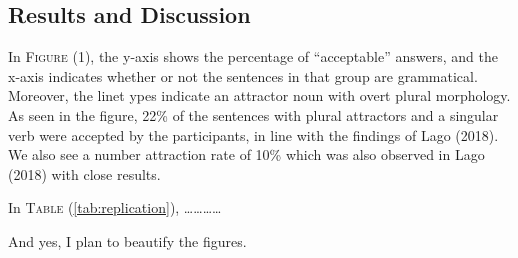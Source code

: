 \documentclass[11pt,a4paper]{article}
\begin{document}
\subsection{Results and Discussion}\label{results-and-discussion}

In \textsc{Figure} (1), the y-axis shows the percentage of
``acceptable'' answers, and the x-axis indicates whether or not the
sentences in that group are grammatical. Moreover, the linet ypes
indicate an attractor noun with overt plural morphology. As seen in the
figure, 22\% of the sentences with plural attractors and a singular verb
were accepted by the participants, in line with the findings of Lago
(2018). We also see a number attraction rate of 10\% which was also
observed in Lago (2018) with close results.

In \textsc{Table} (\ref{tab:replication}),
\ldots{}\ldots{}\ldots{}\ldots{}

And yes, I plan to beautify the figures.

\begin{figure}[H]
  \begin{floatrow}

  \end{floatrow}
\end{figure}
\end{document}
